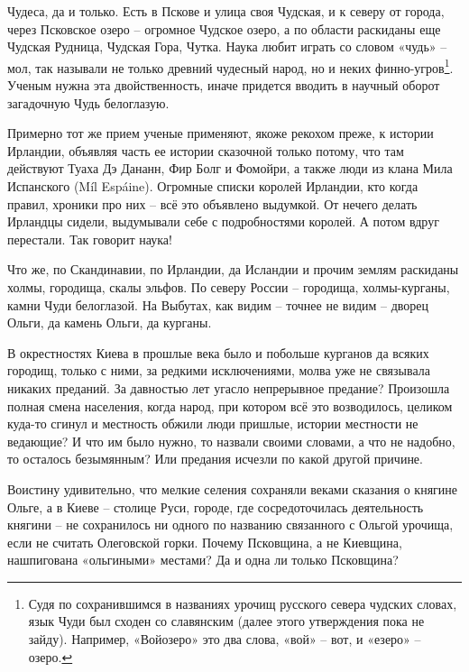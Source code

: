 Чудеса, да и только. Есть в Пскове и улица своя Чудская, и к северу от города, через Псковское озеро – огромное Чудское озеро, а по области раскиданы еще Чудская Рудница, Чудская Гора, Чутка. Наука любит играть со словом «чудь» – мол, так называли не только древний чудесный народ, но и неких финно-угров\footnote{Судя по сохранившимся в названиях урочищ русского севера чудских словах, язык Чуди был сходен со славянским (далее этого утверждения пока не зайду). Например, «Войозеро» это два слова, «вой» – вот, и «езеро» – озеро.}. Ученым нужна эта двойственность, иначе придется вводить в научный оборот загадочную Чудь белоглазую.

Примерно тот же прием ученые применяют, якоже рекохом преже, к истории Ирландии, объявляя часть ее истории сказочной только потому, что там действуют Туаха Дэ Дананн, Фир Болг и Фомойри, а также люди из клана Мила Испанского (Míl Espáine). Огромные списки королей Ирландии, кто когда правил, хроники про них – всё это объявлено выдумкой. От нечего делать Ирландцы сидели, выдумывали себе с подробностями королей. А потом вдруг перестали. Так говорит наука!

Что же, по Скандинавии, по Ирландии, да Исландии и прочим землям раскиданы холмы, городища, скалы эльфов. По северу России – городища, холмы-курганы, камни Чуди белоглазой. На Выбутах, как видим – точнее не видим – дворец Ольги, да камень Ольги, да курганы.

В окрестностях Киева в прошлые века было и побольше курганов да всяких городищ, только с ними, за редкими исключениями, молва уже не связывала никаких преданий. За давностью лет угасло непрерывное предание? Произошла полная смена населения, когда народ, при котором всё это возводилось, целиком куда-то сгинул и местность обжили люди пришлые, истории местности не ведающие? И что им было нужно, то назвали своими словами, а что не надобно, то осталось безымянным? Или предания исчезли по какой другой причине.

Воистину удивительно, что мелкие селения сохраняли веками сказания о княгине Ольге, а в Киеве – столице Руси, городе, где сосредоточилась деятельность княгини – не сохранилось ни одного по названию связанного с Ольгой урочища, если не считать Олеговской горки. Почему Псковщина, а не Киевщина, нашпигована «ольгиными» местами? Да и одна ли только Псковщина?


